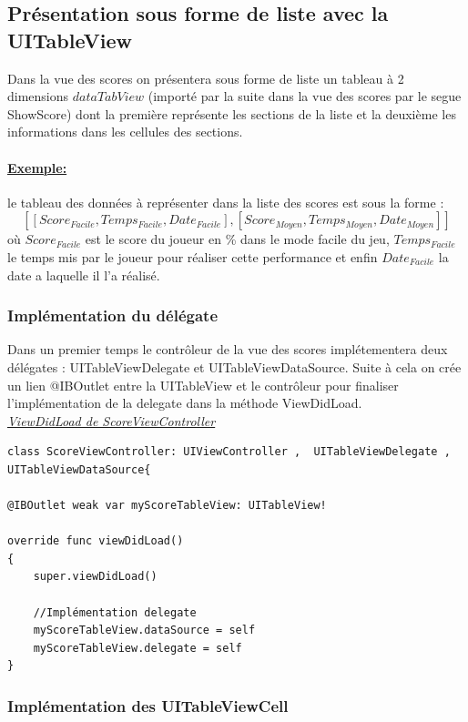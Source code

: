 \documentclass{article}
\begin{document}
\subsection{Présentation sous forme de liste avec la UITableView}

Dans la vue des scores on présentera sous forme de liste un tableau à 2 dimensions $dataTabView$ (importé par la suite dans la vue des scores par le segue ShowScore) dont la première représente les sections de la liste et la deuxième les informations dans les cellules des sections. 

\paragraph{\underline{Exemple:}} le tableau des données à représenter dans la liste des scores est sous la forme : $$[[Score_{Facile},Temps_{Facile}, Date_{Facile}], [Score_{Moyen},Temps_{Moyen}, Date_{Moyen}]]$$
où $Score_{Facile}$ est le score du joueur en \% dans le mode facile du jeu, $Temps_{Facile}$ le 
temps mis par le joueur pour réaliser cette performance et enfin $Date_{Facile}$ la date a laquelle il l'a réalisé. 

\subsubsection{Implémentation du délégate}

Dans un premier temps le contrôleur de la vue des scores implétementera deux délégates :  UITableViewDelegate et UITableViewDataSource. Suite à cela on crée un lien @IBOutlet entre la UITableView et le contrôleur pour finaliser l'implémentation de la delegate dans la méthode ViewDidLoad. \cite{iosProf} \\

\noindent \underline{\textit{ViewDidLoad de ScoreViewController}}
\begin{verbatim}
class ScoreViewController: UIViewController ,  UITableViewDelegate , 
UITableViewDataSource{

@IBOutlet weak var myScoreTableView: UITableView!

override func viewDidLoad()
{
    super.viewDidLoad()
    
    //Implémentation delegate
    myScoreTableView.dataSource = self
    myScoreTableView.delegate = self
}
\end{verbatim}

\subsubsection{Implémentation des UITableViewCell}
\end{document}
